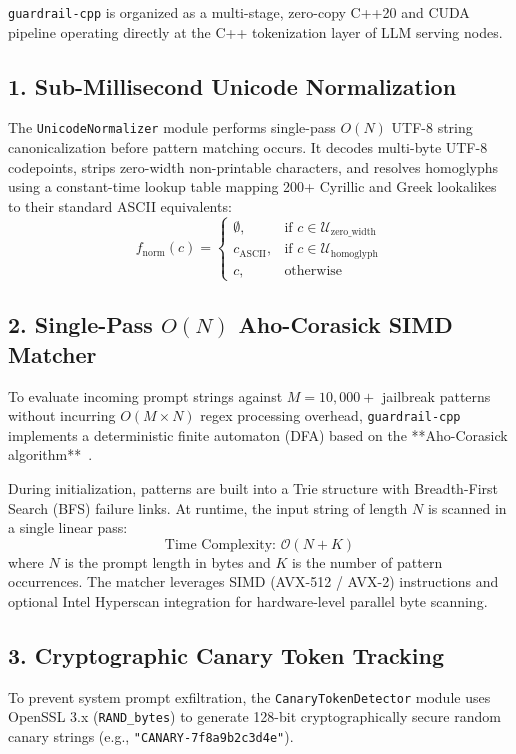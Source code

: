 \documentclass[11pt,a4paper]{article}
\begin{document}
\texttt{guardrail-cpp} is organized as a multi-stage, zero-copy C++20 and CUDA pipeline operating directly at the C++ tokenization layer of LLM serving nodes.

\subsection{1. Sub-Millisecond Unicode Normalization}
The \texttt{UnicodeNormalizer} module performs single-pass $O(N)$ UTF-8 string canonicalization before pattern matching occurs. It decodes multi-byte UTF-8 codepoints, strips zero-width non-printable characters, and resolves homoglyphs using a constant-time lookup table mapping 200+ Cyrillic and Greek lookalikes to their standard ASCII equivalents:
\begin{equation}
f_{\text{norm}}(c) = 
\begin{cases} 
\emptyset, & \text{if } c \in \mathcal{U}_{\text{zero\_width}} \\
c_{\text{ASCII}}, & \text{if } c \in \mathcal{U}_{\text{homoglyph}} \\
c, & \text{otherwise}
\end{cases}
\end{equation}

\subsection{2. Single-Pass $O(N)$ Aho-Corasick SIMD Matcher}
To evaluate incoming prompt strings against $M = 10,000+$ jailbreak patterns without incurring $O(M \times N)$ regex processing overhead, \texttt{guardrail-cpp} implements a deterministic finite automaton (DFA) based on the **Aho-Corasick algorithm**~\cite{aho_corasick}. 

During initialization, patterns are built into a Trie structure with Breadth-First Search (BFS) failure links. At runtime, the input string of length $N$ is scanned in a single linear pass:
\begin{equation}
\text{Time Complexity: } \mathcal{O}(N + K)
\end{equation}
where $N$ is the prompt length in bytes and $K$ is the number of pattern occurrences. The matcher leverages SIMD (AVX-512 / AVX-2) instructions and optional Intel Hyperscan integration for hardware-level parallel byte scanning.

\subsection{3. Cryptographic Canary Token Tracking}
To prevent system prompt exfiltration, the \texttt{CanaryTokenDetector} module uses OpenSSL 3.x (\texttt{RAND\_bytes}) to generate 128-bit cryptographically secure random canary strings (e.g., \texttt{"CANARY-7f8a9b2c3d4e"}). 
\end{document}
